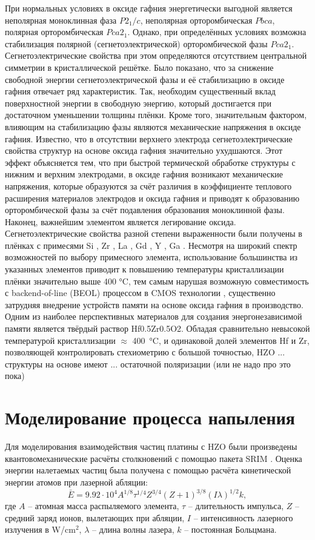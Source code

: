 При нормальных условиях в оксиде гафния энергетически выгодной является неполярная моноклинная фаза \(P2_1/c\), неполярная орторомбическая \(Pbca\), полярная орторомбическая \(Pca2_1\). Однако, при определённых условиях возможна стабилизация полярной (сегнетоэлектрической) орторомбической фазы \(Pca2_1\). Сегнетоэлектрические свойства при этом определяются отсутствием центральной симметрии в кристаллической решётке.
Было показано, что за снижение свободной энергии сегнетоэлектрической фазы и её стабилизацию в оксиде гафния отвечает ряд характеристик. Так, необходим существенный вклад поверхностной энергии в свободную энергию, который достигается при достаточном уменьшении толщины плёнки. Кроме того, значительным фактором, влияющим на стабилизацию фазы являются механические напряжения в оксиде гафния. Известно, что в отсутствии верхнего электрода сегнетоэлектрические свойства структур на основе оксида гафния значительно ухудшаются. Этот эффект объясняется тем, что при быстрой термической обработке структуры с нижним и верхним электродами, в оксиде гафния возникают механические напряжения, которые образуются за счёт различия в коэффициенте теплового расширения материалов электродов и оксида гафния и приводят к образованию орторомбической фазы за счёт подавления образования моноклинной фазы. Наконец, важнейшим элементом является легирование оксида. Сегнетоэлектрические свойства разной степени выраженности были получены в плёнках с примесями Si \cite{}, Zr \cite{}, La \cite{}, Gd \cite{}, Y \cite{}, Ga \cite{chouprikNanoscaleDopingIts2022}. Несмотря на широкий спектр возможностей по выбору примесного элемента, использование большинства из указанных элементов приводит к повышению температуры кристаллизации плёнки значительно выше 400 \si{\degreeCelsius}, тем самым нарушая возможную совместимость с backend-of-line (BEOL) процессом в CMOS технологии \cite{schmitzLowTemperatureThin2018}, существенно затрудняя внедрение устройств памяти на основе оксида гафния в производство. Одним из наиболее перспективных материалов для создания энергонезависимой памяти является твёрдый раствор Hf0.5Zr0.5O2. Обладая сравнительно невысокой температурой кристаллизации \(\approx\) \SI{400}{\degreeCelsius}, и одинаковой долей элементов Hf и Zr, позволяющей контролировать стехиометрию с большой точностью, HZO ... структуры на основе имеют ... остаточной поляризации (или не надо про это пока)
\section{Моделирование процесса напыления}\label{sec:ch1/sec2}
Для моделирования взаимодействия частиц платины с HZO были произведены квантовомеханические расчёты столкновений с помощью пакета SRIM . Оценка энергии налетаемых частиц была получена с помощью расчёта кинетической энергии атомов при лазерной абляции:
\[\bar{E} = 9.92 \cdot 10^{4} A^{1/8} \tau^{1/4} Z^{3/4} (Z+1)^{3/8} (I\lambda)^{1/2}k,\] где \(A\) -- атомная масса распыляемого элемента, \(\tau\) -- длительность импульса, \(Z\) -- средний заряд ионов, вылетающих при абляции, \(I\) -- интенсивность лазерного излучения в \si{\watt}/\si{\cm}\(^2\), \(\lambda\) -- длина волны лазера, \(k\) -- постоянная Больцмана.

